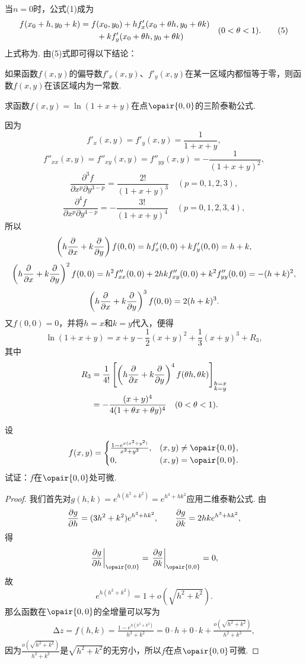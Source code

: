 当\(n=0\)时，公式(1)成为\begin{gather}
\label{equation:多元函数微分法.二元函数的拉格朗日中值公式}
\begin{split}
f(x_0+h,y_0+k)
&=f(x_0,y_0)
+h f'_x(x_0+\theta h,y_0+\theta k) \\
&\hspace{20pt}+k f'_y(x_0+\theta h,y_0+\theta k)
\end{split}
\quad(0<\theta<1).
\tag5
\end{gather}上式称为.
由(5)式即可得以下结论：

如果函数\(f(x,y)\)的偏导数\(f'_x(x,y)\)、\(f'_y(x,y)\)在某一区域内都恒等于零，则函数\(f(x,y)\)在该区域内为一常数.

\begin{example}
求函数\(f(x,y) = \ln(1+x+y)\)在点\(\opair{0,0}\)的三阶泰勒公式.
\begin{solution}
\def\oprt#1{\left(h\pdv{x}+k\pdv{y}\right)\ifx\relax#1\relax\else^{#1}\fi}
因为\[
f'_x(x,y) = f'_y(x,y) = \frac{1}{1+x+y},
\]\[
f''_{xx}(x,y) = f''_{xy}(x,y) = f''_{yy}(x,y) = -\frac{1}{(1+x+y)^2},
\]\[
\frac{\partial^3 f}{\partial x^p \partial y^{3-p}}
= \frac{2!}{(1+x+y)^3}
\quad(p=0,1,2,3),
\]\[
\frac{\partial^4 f}{\partial x^p \partial y^{4-p}}
= -\frac{3!}{(1+x+y)^4}
\quad(p=0,1,2,3,4),
\]所以\[
\oprt{} f(0,0) = h f'_x(0,0) + k f'_y(0,0) = h+k,
\]\[
\oprt{2} f(0,0) = h^2 f''_{xx}(0,0) + 2hk f''_{xy}(0,0) + k^2 f''_{yy}(0,0) = -(h+k)^2,
\]\[
\oprt{3} f(0,0) = 2(h+k)^3.
\]又\(f(0,0)=0\)，并将\(h=x\)和\(k=y\)代入，便得\[
\ln(1+x+y) = x+y-\frac{1}{2}(x+y)^2+\frac{1}{3}(x+y)^3+R_3,
\]其中\begin{align*}
R_3
&= \frac{1}{4!} \left[\oprt{4} f(\theta h,\theta k)\right]_{\substack{h=x\\k=y}} \\
&= -\frac{(x+y)^4}{4(1+\theta x+\theta y)^4}
\quad(0<\theta<1).
\end{align*}
\end{solution}
\end{example}

\begin{example}
\def\ev#1{\eval{#1}_{\opair{0,0}}}%
设\[
f(x,y) = \begin{cases}
\frac{1 - e^{x(x^2+y^2)}}{x^2+y^2}, & (x,y)\neq\opair{0,0}, \\
0, & (x,y)=\opair{0,0}.
\end{cases}
\]试证：\(f\)在\(\opair{0,0}\)处可微.
\begin{proof}
我们首先对\(g(h,k) = e^{h(h^2+k^2)} = e^{h^3+hk^2}\)应用二维泰勒公式.
由\[
\pdv{g}{h} = (3h^2+k^2)e^{h^3+hk^2}, \qquad
\pdv{g}{k} = 2hke^{h^3+hk^2},
\]得\[
\ev{\pdv{g}{h}} = \ev{\pdv{g}{k}} = 0,
\]故\[
e^{h(h^2+k^2)} = 1 + o(\sqrt{h^2+k^2}).
\]
那么函数在\(\opair{0,0}\)的全增量可以写为
\begin{align*}
\increment z = f(h,k) = \frac{1 - e^{h(h^2+k^2)}}{h^2+k^2}
= 0 \cdot h + 0 \cdot k + \frac{o(\sqrt{h^2+k^2})}{h^2+k^2},
\end{align*}
因为\(\frac{o(\sqrt{h^2+k^2})}{h^2+k^2}\)是\(\sqrt{h^2+k^2}\)的无穷小，所以\(f\)在点\(\opair{0,0}\)可微.
\end{proof}
\end{example}

